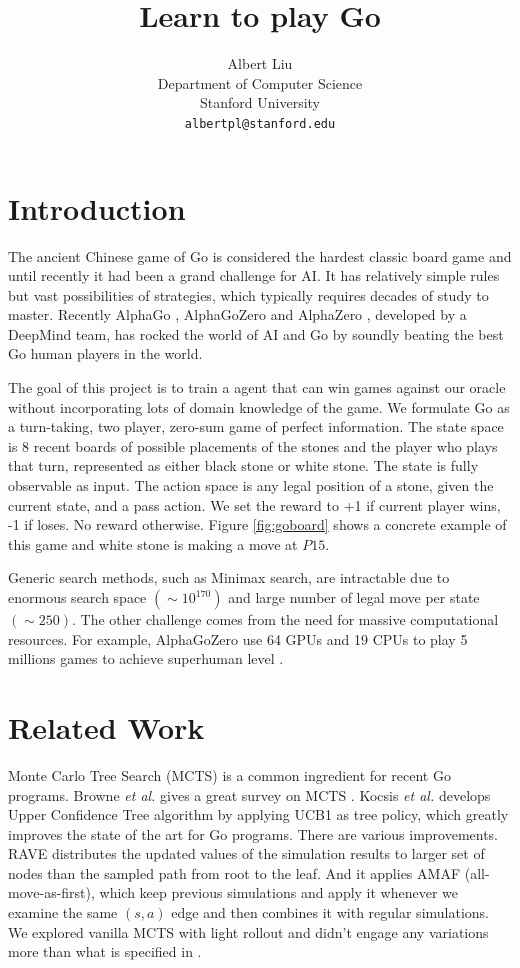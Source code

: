 \documentclass{article}
\title{Learn to play Go}
\author{%
  Albert Liu \\
  Department of Computer Science\\
  Stanford University\\
  \texttt{albertpl@stanford.edu} \\
}
\begin{document}
\maketitle

\section{Introduction}

The ancient Chinese game of Go is considered the hardest classic board game and until recently it had been a grand challenge for AI. It has relatively simple rules but vast possibilities of strategies, which typically requires decades of study to master.  Recently AlphaGo \cite{silver2016mastering}, AlphaGoZero \cite{silver2017masteringalphagozero} and AlphaZero \cite{silver2017masteringalphazero}, developed by a DeepMind team, has rocked the world of AI and Go by soundly beating the best Go human players in the world.

The goal of this project is to train a agent that can win games against our oracle without incorporating lots of domain knowledge of the game. We formulate Go as a turn-taking, two player, zero-sum game of perfect information. The state space is 8 recent boards of possible placements of the stones and the player who plays that turn, represented as either black stone or white stone. The state is fully observable as input. The action space is any legal position of a stone, given the current state, and a pass action. We set the reward to +1 if current player wins, -1 if loses. No reward otherwise. Figure \ref{fig:goboard} shows a concrete example of this game and white stone is making a move at $P15$. 

Generic search methods, such as Minimax search, are intractable due to enormous search space $(\sim 10^{170})$ and large number of legal move per state$(\sim 250)$. The other challenge comes from the need for massive computational resources. For example, AlphaGoZero use 64 GPUs and 19 CPUs to play 5 millions games to achieve superhuman level \cite{silver2017masteringalphagozero}.

\section{Related Work}
Monte Carlo Tree Search (MCTS) is a common ingredient for recent Go programs. Browne \textit{et al.} gives a great survey on MCTS \cite{browne2012survey}. Kocsis \textit{et al.} develops Upper Confidence Tree \cite{kocsis2006bandit} algorithm by applying UCB1 \cite{auer2002finite} as tree policy, which greatly improves the state of the art for Go programs. There are various improvements. RAVE \cite{gelly2007combining} distributes the updated values of the simulation results to larger set of nodes than the sampled path from root to the leaf. And it applies AMAF \cite{bouzy2004monte} (all-move-as-first), which keep previous simulations and apply it whenever we examine the same $(s, a)$ edge and then combines it with regular simulations. We explored vanilla MCTS with light rollout and didn't engage any variations more than what is specified in \cite{silver2017masteringalphagozero}.
\end{document}
